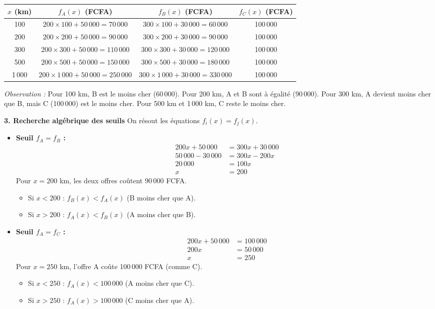 \documentclass[11pt]{article}
\begin{document}
\begin{exoresolu}
\begin{center}
\begin{tabular}{|c|c|c|c|}\hline
$x$ (km) & $f_A(x)$ (FCFA) & $f_B(x)$ (FCFA) & $f_C(x)$ (FCFA) \\ \hline
100 & $200\times100 + 50\,000 = 70\,000$ & $300\times100 + 30\,000 = 60\,000$ & 100\,000 \\ \hline
200 & $200\times200 + 50\,000 = 90\,000$ & $300\times200 + 30\,000 = 90\,000$ & 100\,000 \\ \hline
300 & $200\times300 + 50\,000 = 110\,000$ & $300\times300 + 30\,000 = 120\,000$ & 100\,000 \\ \hline
500 & $200\times500 + 50\,000 = 150\,000$ & $300\times500 + 30\,000 = 180\,000$ & 100\,000 \\ \hline
1\,000 & $200\times1\,000 + 50\,000 = 250\,000$ & $300\times1\,000 + 30\,000 = 330\,000$ & 100\,000 \\ \hline
\end{tabular}
\end{center}
\emph{Observation :} Pour 100 km, B est le moins cher (60\,000). Pour 200 km, A et B sont à égalité (90\,000). Pour 300 km, A devient moins cher que B, mais C (100\,000) est le moins cher. Pour 500 km et 1\,000 km, C reste le moins cher.

\textbf{3. Recherche algébrique des seuils}
On résout les équations $f_i(x) = f_j(x)$.

\begin{itemize}
    \item \textbf{Seuil $f_A = f_B$ :}
    \begin{align*}
        200x + 50\,000 &= 300x + 30\,000 \\
        50\,000 - 30\,000 &= 300x - 200x \\
        20\,000 &= 100x \\
        x &= 200
    \end{align*}
    Pour $x = 200$ km, les deux offres coûtent 90\,000 FCFA.
    \begin{itemize}
        \item Si $x < 200$ : $f_B(x) < f_A(x)$ (B moins cher que A).
        \item Si $x > 200$ : $f_A(x) < f_B(x)$ (A moins cher que B).
    \end{itemize}

    \item \textbf{Seuil $f_A = f_C$ :}
    \begin{align*}
        200x + 50\,000 &= 100\,000 \\
        200x &= 50\,000 \\
        x &= 250
    \end{align*}
    Pour $x = 250$ km, l'offre A coûte 100\,000 FCFA (comme C).
    \begin{itemize}
        \item Si $x < 250$ : $f_A(x) < 100\,000$ (A moins cher que C).
        \item Si $x > 250$ : $f_A(x) > 100\,000$ (C moins cher que A).
    \end{itemize}


\end{itemize}
\end{exoresolu}
\end{document}

